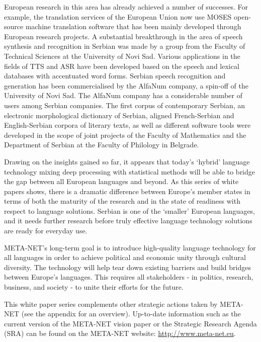 \begin{multicols}{2}
European research in this area has already achieved a number of successes. For example, the translation services of the European Union now use MOSES open-source machine translation software that has been mainly developed through European research projects. A substantial breakthrough in the area of speech synthesis and recognition
in Serbian was
made by a group from the Faculty of Technical Sciences
at the University of Novi Sad.
Various applications in the fields of TTS and ASR
have been developed based on the speech and lexical databases with accentuated word forms. 
Serbian
speech recognition and generation has been commercialised
by the AlfaNum company, a spin-off of the University
of Novi Sad. The AlfaNum company has a considerable
number of users among Serbian companies.
The first
corpus of contemporary Serbian, an electronic
morphological dictionary of Serbian, aligned French-Serbian
and English-Serbian corpora of literary texts,
as well as different software tools 
were developed in the scope of joint projects 
of the Faculty of Mathematics
and the Department of Serbian at the
Faculty of Philology in Belgrade.


Drawing on the insights gained so far, it appears that today’s `hybrid' language technology mixing deep processing with statistical methods will be able to bridge the gap between all European languages and beyond. As this series of white papers shows, there is a dramatic difference between Europe's member states in terms of both the maturity of the research and in the state of readiness with respect to language solutions. Serbian is one of the ‘smaller’ European languages, and it needs further research before truly effective language technology solutions are ready for everyday use. 

META-NET’s long-term goal is to introduce high-quality language technology for all languages in order to achieve political and economic unity through cultural diversity. The technology will help tear down existing barriers and build bridges between Europe’s languages. This requires all stakeholders - in politics, research, business, and society - to unite their efforts for the future.

This white paper series complements other strategic actions taken by META-NET (see the appendix for an overview). Up-to-date information such as the current version of the META-NET vision paper \cite{Meta1} or the Strategic Research Agenda (SRA) can be found on the META-NET website: \url{http://www.meta-net.eu}.
\end{multicols}

